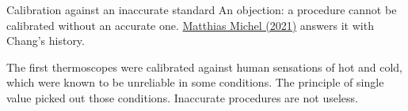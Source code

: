 \documentclass[aspectratio=169,11pt]{beamer}
\begin{document}
\begin{frame}[label=inaccurate]{Calibration against an inaccurate standard}
An objection: a procedure cannot be calibrated without an accurate one. \href{https://philpapers.org/archive/MICCIC-2.pdf}{Matthias Michel (2021)} answers it with Chang's history.

\vspace{0.5em}
\begin{center}
\end{center}

\vspace{0.2em}
{\small The first thermoscopes were calibrated against human sensations of hot and cold, which were known to be unreliable in some conditions. The principle of single value picked out those conditions. Inaccurate procedures are not useless.}
\end{frame}
\end{document}
